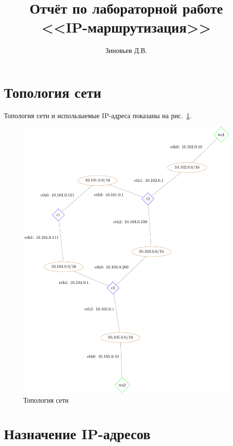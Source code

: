 \documentclass[a4paper,12pt]{article}
\title{Отчёт по лабораторной работе \\ <<IP-маршрутизация>>}
\author{Зиновьев Д.В.}
\begin{document}
\maketitle

\tableofcontents

\section{Топология сети}

Топология сети и использыемые IP-адреса показаны на рис.~\ref{fig:network}.

\begin{figure}
\centering
\includegraphics[width=\textwidth]{includes/network_gv.pdf}
\caption{Топология сети}
\label{fig:network}
\end{figure}


\section{Назначение IP-адресов}
\end{document}
